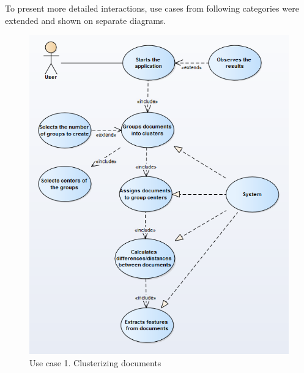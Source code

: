 To present more detailed interactions, use cases from following categories were extended and shown on separate diagrams.

\begin{figure}[H]
	\begin{center}
		\includegraphics[width=1.0\linewidth]{images/diagrams/use-case/clusterization.PNG}
		\caption{Use case 1. Clusterizing documents}
		\label{design-use-case-1}
	\end{center}
\end{figure}

